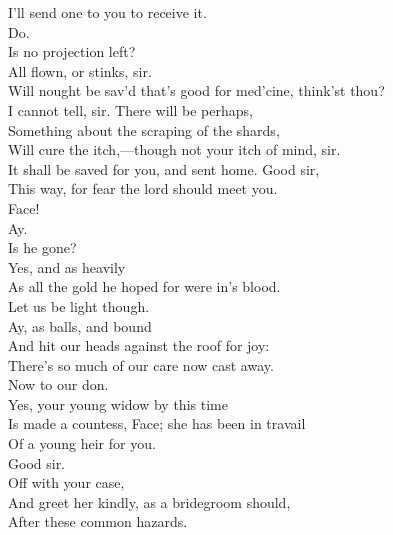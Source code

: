 \documentclass[a4paper,oneside]{memoir}
\begin{document}
\begin{drama*}
\facespeaks {} I'll send one to you to receive it.\\
\mammonspeaks {} Do.\\
Is no projection left?\\
\facespeaks {} All flown, or stinks, sir.\\
\mammonspeaks Will nought be sav'd that's good for med'cine, think'st thou?\\
\facespeaks I cannot tell, sir. There will be perhaps,\\
Something about the scraping of the shards,\\
Will cure the itch,---though not your itch of mind, sir.\\
It shall be saved for you, and sent home. Good sir,\\
This way, for fear the lord should meet you.\\
\subtlespeaks {}  Face!\\
\facespeaks Ay.\\
\subtlespeaks {} Is he gone?\\
\facespeaks {} Yes, and as heavily\\
As all the gold he hoped for were in's blood.\\
Let us be light though.\\
\subtlespeaks {}  Ay, as balls, and bound\\
And hit our heads against the roof for joy:\\
There's so much of our care now cast away.\\
\facespeaks Now to our don.\\
\subtlespeaks {} Yes, your young widow by this time\\
Is made a countess, Face; she has been in travail\\
Of a young heir for you.\\
\facespeaks {} Good sir.\\
\subtlespeaks {} Off with your case,\\
And greet her kindly, as a bridegroom should,\\
After these common hazards.\\

\end{drama*}
\end{document}
